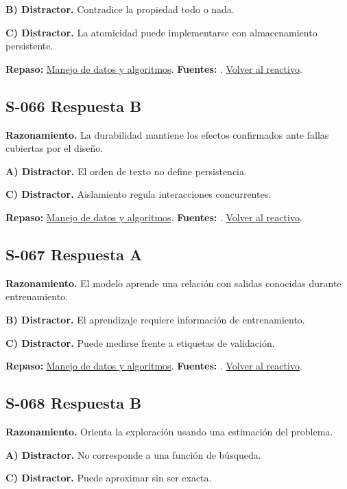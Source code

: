 \textbf{B) Distractor. }Contradice la propiedad todo o nada.

\textbf{C) Distractor. }La atomicidad puede implementarse con almacenamiento persistente.

\textbf{Repaso:} \hyperref[sec:s3]{Manejo de datos y algoritmos}. \textbf{Fuentes:} \cite{algorithms,postgres,ai}. \hyperref[q:S-065]{Volver al reactivo}.\par\medskip

\subsection*{S-066 \quad Respuesta B}\label{s:S-066}
\textbf{Razonamiento.} La durabilidad mantiene los efectos confirmados ante fallas cubiertas por el diseño.

\textbf{A) Distractor. }El orden de texto no define persistencia.

\textbf{C) Distractor. }Aislamiento regula interacciones concurrentes.

\textbf{Repaso:} \hyperref[sec:s3]{Manejo de datos y algoritmos}. \textbf{Fuentes:} \cite{algorithms,postgres,ai}. \hyperref[q:S-066]{Volver al reactivo}.\par\medskip

\subsection*{S-067 \quad Respuesta A}\label{s:S-067}
\textbf{Razonamiento.} El modelo aprende una relación con salidas conocidas durante entrenamiento.

\textbf{B) Distractor. }El aprendizaje requiere información de entrenamiento.

\textbf{C) Distractor. }Puede medirse frente a etiquetas de validación.

\textbf{Repaso:} \hyperref[sec:s3]{Manejo de datos y algoritmos}. \textbf{Fuentes:} \cite{algorithms,postgres,ai}. \hyperref[q:S-067]{Volver al reactivo}.\par\medskip

\subsection*{S-068 \quad Respuesta B}\label{s:S-068}
\textbf{Razonamiento.} Orienta la exploración usando una estimación del problema.

\textbf{A) Distractor. }No corresponde a una función de búsqueda.

\textbf{C) Distractor. }Puede aproximar sin ser exacta.

